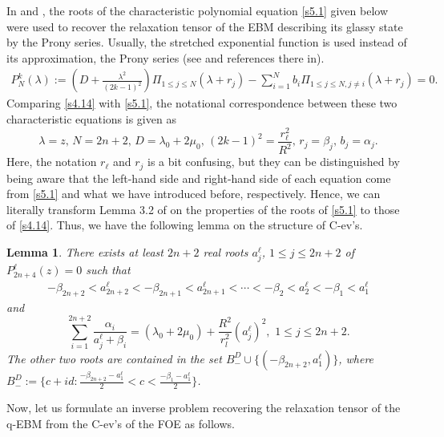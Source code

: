 \documentclass[a4paper,12pt]{article}
\newtheorem{lemma}[Th]{Lemma}
\newtheorem{a priori condition}[Th]{A priori condition}
\begin{document}
In \cite{CDDLN1} and \cite{CDDLN2}, the roots of the characteristic polynomial equation \eqref{s5.1} given below were used to recover the relaxation tensor of the EBM describing its glassy state by the Prony series. Usually, the stretched exponential function is used instead of its approximation, the Prony series (see \cite{CDDLN1, CDDLN2} and references there in).
\begin{equation}\label{s5.1}
\begin{aligned}
P_N^k(\lambda):=(D+\frac{\lambda^2}{(2k-1)^2})\Pi_{1\leq j\leq N}(\lambda+r_j) -  \sum_{i=1}^N b_i\Pi_{1\leq j\leq N,j\neq i}(\lambda+r_j) =0.
\end{aligned}
\end{equation}
Comparing \eqref{s4.14} with \eqref{s5.1}, the notational correspondence between these two characteristic equations is given as
$$\lambda=z,\,N=2n+2,\,D=\lambda_0+2\mu_0,\, (2k-1)^2=\frac{r_\ell^2}{R^2},\,r_j=\beta_j,\,b_j=\alpha_j.$$
Here, the notation $r_\ell$ and $r_j$ is a bit confusing, but they can be distinguished by being aware that the left-hand side and right-hand side of each equation come from \eqref{s5.1} and what we have introduced before, respectively. 
Hence, we can literally transform Lemma 3.2 of \cite{CDDLN1} on the properties of the roots of \eqref{s5.1} to those of \eqref{s4.14}. Thus, we have the following lemma on the structure of C-ev's.
\begin{lemma}\label{s_lem5.1}
There exists at least $2n+2$ real roots $a^\ell_j$, $1\leq j\leq 2n+2$ of  $P^\ell_{2n+4}(z)=0$ such that 
\begin{equation}\label{s5.2}
\begin{aligned}
-\beta_{2n+2}<a^\ell_{2n+2}<-\beta_{2n+1}<a^\ell_{2n+1}<\cdots<-\beta_{2}<a^\ell_2<-\beta_{1}<a^\ell_1
\end{aligned}
\end{equation}
and
\begin{equation}
\label{s5.3}
 \sum_{i=1}^{2n+2} \frac{\alpha_i}{a^\ell_j+\beta_i} =(\lambda_0+2\mu_0)+\frac{R^2}{r_l^2}(a^\ell_j)^2,\,\,1\le j\le 2n+2.
\end{equation}
The other two roots are contained in the set $B^D_-\cup \{(-\beta_{2n+2},a^\ell_1)\} $, where $B^D_-:=\{c+id :\frac{-\beta_{2n+2}-a^\ell_1}{2}<c<\frac{-\beta_{1}-a^\ell_1}{2}\} $.
\end{lemma}


\medskip
Now, let us formulate an inverse problem recovering the relaxation tensor of the q-EBM from the C-ev's of the FOE as follows.
\end{document}
